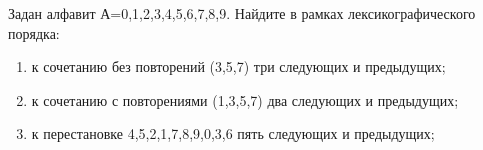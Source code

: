 \question 
Задан алфавит А={0,1,2,3,4,5,6,7,8,9}. Найдите в рамках лексикографического порядка:
\begin{enumerate}
\item  к сочетанию без повторений (3,5,7) три следующих и предыдущих;
\item  к сочетанию с повторениями (1,3,5,7) два следующих и предыдущих;
\item  к перестановке 4,5,2,1,7,8,9,0,3,6 пять следующих и предыдущих;
\end{enumerate}

